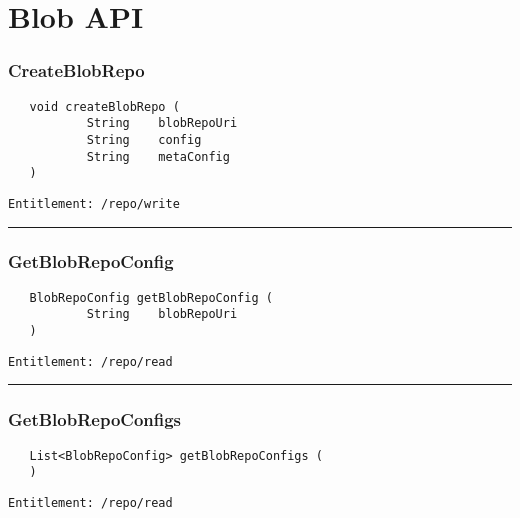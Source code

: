 \chapter{Blob API}

\subsection{CreateBlobRepo}
\label{Api:CreateBlobRepo}
\begin{Verbatim}
   void createBlobRepo (
           String    blobRepoUri
           String    config
           String    metaConfig
   )
\end{Verbatim}
\begin{Verbatim}[formatcom=\color{Maroon}]
  Entitlement: /repo/write
\end{Verbatim}



\rule{12cm}{2pt}
\subsection{GetBlobRepoConfig}
\label{Api:GetBlobRepoConfig}
\begin{Verbatim}
   BlobRepoConfig getBlobRepoConfig (
           String    blobRepoUri
   )
\end{Verbatim}
\begin{Verbatim}[formatcom=\color{Maroon}]
  Entitlement: /repo/read
\end{Verbatim}



\rule{12cm}{2pt}
\subsection{GetBlobRepoConfigs}
\label{Api:GetBlobRepoConfigs}
\begin{Verbatim}
   List<BlobRepoConfig> getBlobRepoConfigs (
   )
\end{Verbatim}
\begin{Verbatim}[formatcom=\color{Maroon}]
  Entitlement: /repo/read
\end{Verbatim}



